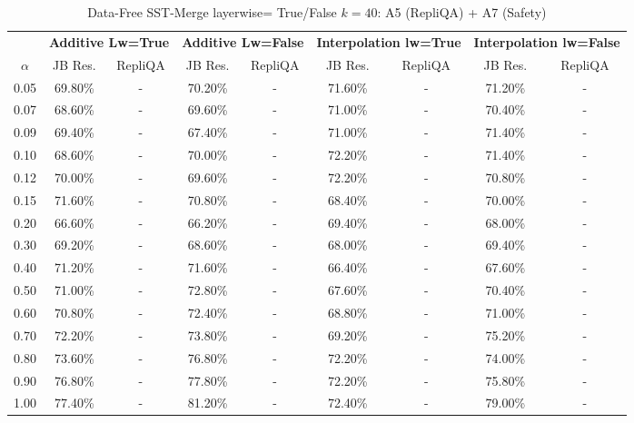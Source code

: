 \begin{table}[h]
\centering
\caption{Data-Free SST-Merge layerwise= True/False $k=40$: A5 (RepliQA) + A7 (Safety)}
\label{tab:res_a5_a7_data_free_sst_40}
\begin{tabular}{c|cc|cc|cc|cc}
\hline
 & \multicolumn{2}{c|}{\textbf{Additive Lw=True}} & \multicolumn{2}{c|}{\textbf{Additive Lw=False}} & \multicolumn{2}{c|}{\textbf{Interpolation lw=True}}& \multicolumn{2}{c}{\textbf{Interpolation lw=False}} \\
$\alpha$ & JB Res. & RepliQA & JB Res. & RepliQA & JB Res. & RepliQA & JB Res. & RepliQA \\
\hline
0.05 & 69.80\% & - & 70.20\% & - & 71.60\% & - & 71.20\% & - \\
0.07 & 68.60\% & - & 69.60\% & - & 71.00\% & - & 70.40\% & - \\
0.09 & 69.40\% & - & 67.40\% & - & 71.00\% & - & 71.40\% & - \\
0.10 & 68.60\% & - & 70.00\% & - & 72.20\% & - & 71.40\% & - \\
0.12 & 70.00\% & - & 69.60\% & - & 72.20\% & - & 70.80\% & - \\
0.15 & 71.60\% & - & 70.80\% & - & 68.40\% & - & 70.00\% & - \\
0.20 & 66.60\% & - & 66.20\% & - & 69.40\% & - & 68.00\% & - \\
0.30 & 69.20\% & - & 68.60\% & - & 68.00\% & - & 69.40\% & - \\
0.40 & 71.20\% & - & 71.60\% & - & 66.40\% & - & 67.60\% & - \\
0.50 & 71.00\% & - & 72.80\% & - & 67.60\% & - & 70.40\% & - \\
0.60 & 70.80\% & - & 72.40\% & - & 68.80\% & - & 71.00\% & - \\
0.70 & 72.20\% & - & 73.80\% & - & 69.20\% & - & 75.20\% & - \\
0.80 & 73.60\% & - & 76.80\% & - & 72.20\% & - & 74.00\% & - \\
0.90 & 76.80\% & - & 77.80\% & - & 72.20\% & - & 75.80\% & - \\
1.00 & 77.40\% & - & 81.20\% & - & 72.40\% & - & 79.00\% & - \\
\hline
\end{tabular}
\end{table}
\FloatBarrier

